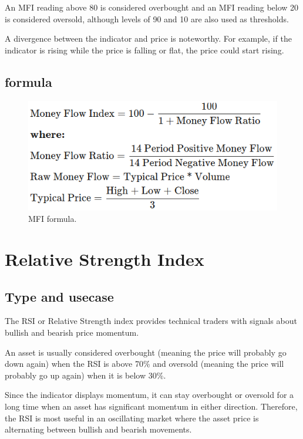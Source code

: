 \documentclass[12pt,a4paper]{article}
\begin{document}
An MFI reading above 80 is considered overbought and an MFI reading below 20 is considered oversold, although levels of 90 and 10 are also used as thresholds.

A divergence between the indicator and price is noteworthy. For example, if the indicator is rising while the price is falling or flat, the price could start rising.

\subsection{formula}

\begin{figure}[H]
    \includegraphics[scale=0.7]{../images/MFI.png}
    \caption{MFI formula.}
    \label{fig:MFI}
\end{figure}

\section{Relative Strength Index}

\subsection{Type and usecase}
The RSI or Relative Strength index provides technical traders with signals about bullish and bearish price momentum.

An asset is usually considered overbought (meaning the price will probably go down again) when the RSI is above 70\% and oversold (meaning the price will probably go up again) when it is below 30\%.

Since the indicator displays momentum, it can stay overbought or oversold for a long time when an asset has significant momentum in either direction. Therefore, the RSI is most useful in an oscillating market where the asset price is alternating between bullish and bearish movements.
\end{document}
